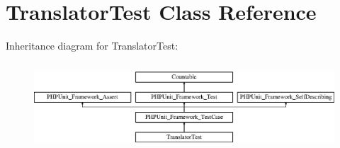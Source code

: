 \section{Translator\+Test Class Reference}
\label{class_symfony_1_1_component_1_1_translation_1_1_tests_1_1_translator_test}
Inheritance diagram for Translator\+Test\+:\begin{figure}[H]
\begin{center}
\leavevmode
\includegraphics[height=3.303835cm]{class_symfony_1_1_component_1_1_translation_1_1_tests_1_1_translator_test}
\end{center}
\end{figure}
